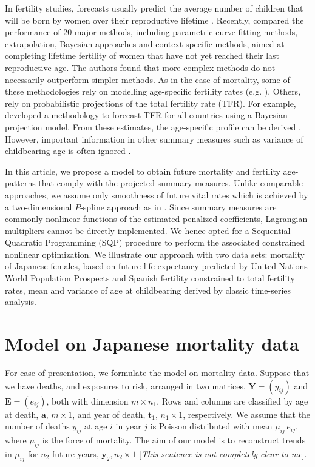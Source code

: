 \documentclass[a4paper,twoside, openright, 12pt, leqno]{article}
\begin{document}
In fertility studies, forecasts usually predict the average number of children that will be born by women over their reproductive lifetime \citep{bohk2018forecast}. Recently, \citet{bohk2018forecast} compared the performance of 20 major methods, including parametric curve fitting methods, extrapolation, Bayesian approaches and context-specific methods, aimed at completing lifetime fertility of women that have not yet reached their last reproductive age. The authors found that more complex methods do not necessarily outperform simpler methods. As in the case of mortality, some of these methodologies rely on modelling age-specific fertility rates (e.g. \citet{coale1974model,chandola1999recent,schmertmann2003system,peristera2007modeling,hyndman2008stochastic}). Others, rely on probabilistic projections of the total fertility rate (TFR). For example, \citet{alkema2011probabilistic} developed a methodology to forecast TFR for all countries using a Bayesian projection model. From these estimates, the age-specific profile can be derived \citep{vsevvcikova2016age}. However, important information in other summary measures such as variance of childbearing age is often ignored \citep{hruschka2016does}.

In this article, we propose a model to obtain future mortality and fertility age-patterns that comply with the projected summary measures. Unlike comparable approaches, we assume only smoothness of future vital rates which is achieved by a two-dimensional $P$-spline approach as in \citet{currie2004smoothing}. Since summary measures are commonly nonlinear functions of the estimated penalized coefficients, Lagrangian multipliers cannot be directly implemented. We hence opted for a Sequential Quadratic Programming (SQP) procedure \citep{nocedal2006sequential} to perform the associated constrained nonlinear optimization. We illustrate our approach with two data sets: mortality of Japanese females, based on future life expectancy predicted by United Nations World Population Prospects \citep{UN2017} and Spanish fertility constrained to total fertility rates, mean and variance of age at childbearing derived by classic time-series analysis.


\section{Model on Japanese mortality data}

For ease of presentation, we formulate the model on mortality data. Suppose that we have deaths, and exposures to risk, arranged in two matrices, 
$\bm{Y} = (y_{ij})$ and $\bm{E} = (e_{ij})$, both with dimension $m \times n_{1}$.  Rows and columns are classified by age at death, $\bm{a}, \,m \times 1$, and year of death, $\bm{t}_{1}, \,n_{1} \times 1$, respectively.  
We assume that the number of deaths $y_{ij}$ at age $i$ in year $j$ is Poisson distributed with mean $\mu_{ij} \,e_{ij}$, where $\mu_{ij}$ is the force of mortality. 
The aim of our model is to reconstruct trends in $\mu_{ij}$ for  $n_{2}$ future years, $\bm{y}_{2}, n_{2} \times 1$ [\textit{This sentence is not completely clear to me}].
\end{document}
